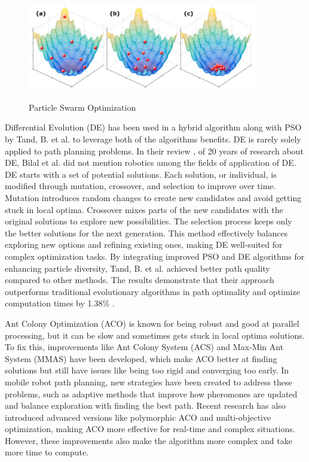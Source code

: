 \begin{figure}[H]
    \begin{center}
        \includegraphics[width=4in]{images/Chap1/PSO.png}\\
        \caption{Particle Swarm Optimization \cite{R42}}
        \label{pso}
    \end{center}
\end{figure}

Differential Evolution (DE) has been used in a hybrid algorithm along with PSO by Tand, B. et al. \cite{R43} to leverage 
both of the algorithms benefits. DE is rarely solely applied to path planning problems. In their review \cite{R37}, 
of 20 years of research about DE, Bilal et al. did not mention robotics among the fields of application of DE. 
DE starts with a set of potential solutions. Each solution, or individual, is modified 
through mutation, crossover, and selection to improve over time. Mutation introduces random changes to create new 
candidates and avoid getting stuck in local optima. Crossover mixes parts of the new candidates with the original 
solutions to explore new possibilities. The selection process keeps only the better solutions for the next generation. 
This method effectively balances exploring new options and refining existing ones, making DE well-suited for complex 
optimization tasks.
By integrating improved PSO and DE algorithms for enhancing particle diversity, Tand, B. et al. achieved better 
path quality compared to other methods. The results demonstrate that their approach outperforms traditional 
evolutionary algorithms in path optimality and optimize computation times by 1.38\% \cite{R43}. 

Ant Colony Optimization (ACO) is known for being robust and good at parallel processing, but it can be slow and 
sometimes gets stuck in local optima solutions. To fix this, improvements like Ant Colony System (ACS) 
and Max-Min Ant System (MMAS) have been developed, which make ACO better at finding solutions but still have 
issues like being too rigid and converging too early. In mobile robot path planning, new strategies have been 
created to address these problems, such as adaptive methods that improve how pheromones are updated and balance 
exploration with finding the best path. Recent research has also introduced advanced versions like polymorphic 
ACO and multi-objective optimization, making ACO more effective for real-time and complex situations. However, 
these improvements also make the algorithm more complex and take more time to compute.


